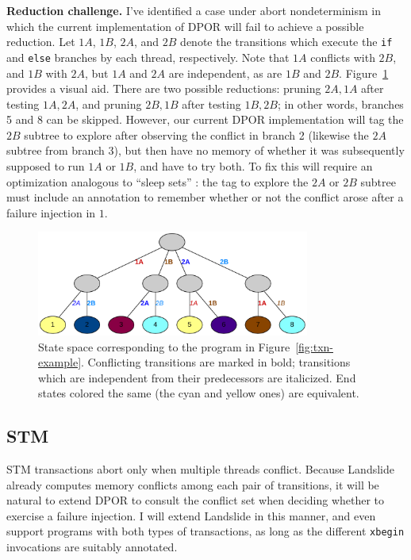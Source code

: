 {\bf Reduction challenge.}
I've identified a case under abort nondeterminism in which the current implementation of DPOR will fail to achieve a possible reduction.
Let $1A$, $1B$, $2A$, and $2B$ denote the transitions which execute the {\tt if} and {\tt else} branches by each thread, respectively.
Note that $1A$ conflicts with $2B$, and $1B$ with $2A$, but $1A$ and $2A$ are independent, as are $1B$ and $2B$.
Figure~\ref{fig:txn-graph} provides a visual aid.
There are two possible reductions: pruning $2A,1A$ after testing $1A,2A$, and pruning $2B,1B$ after testing $1B,2B$;
in other words, branches 5 and 8 can be skipped.
However, %
our current DPOR implementation will tag the $2B$ subtree to explore after observing the conflict in branch 2 (likewise the $2A$ subtree from branch 3),
but then have no memory of whether it was subsequently supposed to run $1A$ or $1B$, and have to try both.
To fix this will require an optimization analogous to ``sleep sets'' \cite{dpor}:
the tag to explore the $2A$ or $2B$ subtree must include an annotation to remember whether or not the conflict arose after a failure injection in $1$.

\begin{figure}[t]
	\begin{center}
		\includegraphics[width=0.8\textwidth]{htm-graph.pdf}
	\end{center}
	\caption{State space corresponding to the program in Figure~\ref{fig:txn-example}.
	Conflicting transitions are marked in bold;
	transitions which are independent from their predecessors are italicized.
	End states colored the same (the cyan and yellow ones) are equivalent.
	}
	\label{fig:txn-graph}
\end{figure}

\subsection{STM}

STM transactions abort only when multiple threads conflict.
Because Landslide already computes memory conflicts among each pair of transitions, it will be natural to extend DPOR to consult the conflict set when deciding whether to exercise a failure injection.
I will extend Landslide in this manner, and even support programs with both types of transactions, as long as the different {\tt xbegin} invocations are suitably annotated.

